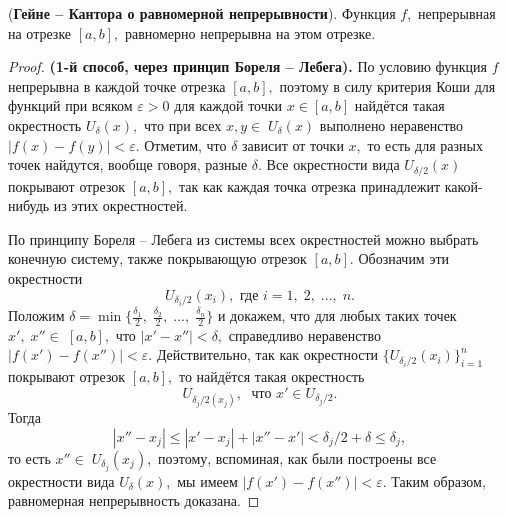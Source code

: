 \begin{theorem}(\textbf{Гейне -- Кантора о равномерной
        непрерывности}).
    Функция $f,$ непрерывная на отрезке $[a, b],$
    равномерно непрерывна на этом отрезке.
\end{theorem}
\begin{proof} \textbf{(1-й способ, через
        принцип Бореля -- Лебега).}
    По условию функция $f$ непрерывна в каждой точке
    отрезка $[a, b],$ поэтому в силу критерия Коши
    для функций при всяком $\varepsilon>0$
    для каждой точки $x\in[a, b]$
    найдётся такая окрестность $U_{\delta}(x),$
    что при всех $x, y\in\;U_{\delta}(x)$
    выполнено неравенство $|f(x)-f(y)|<\varepsilon.$
    Отметим, что $\delta$ зависит от точки
    $x,$ то есть для разных точек найдутся,
    вообще говоря, разные $\delta.$
    Все окрестности вида $U_{\delta/2}(x)$покрывают
    отрезок $[a, b],$ так как каждая
    точка отрезка принадлежит
    какой-нибудь из этих окрестностей.

    По принципу Бореля -- Лебега из
    системы всех окрестностей можно
    выбрать конечную систему,
    также покрывающую отрезок $[a, b].$
    Обозначим эти окрестности
    $$
        U_{\delta_i/2}(x_i),
        \textrm{ где } i=1,\;2,\;...,\;n.
    $$
    Положим
    $\delta=\min\{\frac{\delta_1}{2},\;
        \frac{\delta_2}{2},\;...,\;\frac{\delta_n}{2}\}$
    и докажем, что для любых таких точек $x',\;
        x''\in\;[a, b],$ что $|x'-x''|<\delta,$
    справедливо неравенство $|f(x')-f(x'')|
        <\varepsilon.$ Действительно, так как
    окрестности $\{U_{\delta_i/2}
        (x_i)\}_{i=1}^n$ покрывают
    отрезок $[a, b],$ то найдётся
    такая окрестность
    $$
        U_{\delta_j/2(x_j)},\;
        \textrm{ что }
        x'\in U_{\delta_j/2}.
    $$
    Тогда
    $$
        |x''-x_j|\leq|x'-x_j|+|x''-x'|<\delta_j/2+
        \delta\leq\delta_j,
    $$
    то есть $x''\in\;U_{\delta_j}(x_j),$
    поэтому, вспоминая, как были построены
    все окрестности вида $U_{\delta}(x),$
    мы имеем $|f(x')-f(x'')|<\varepsilon.$
    Таким образом, равномерная непрерывность
    доказана.
\end{proof}
